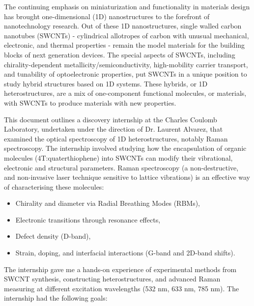 The continuing emphasis on miniaturization and functionality in materials design has brought one-dimensional (1D) nanostructures to the forefront of nanotechnology research. Out of these 1D nanostructures, single walled carbon nanotubes (SWCNTs) - cylindrical allotropes of carbon with unusual mechanical, electronic, and thermal properties - remain the model materials for the building blocks of next generation devices. The special aspects of SWCNTs, including chirality-dependent metallicity/semiconductivity, high-mobility carrier transport, and tunability of optoelectronic properties, put SWCNTs in a unique position to study hybrid structures based on 1D systems. These hybrids, or 1D heterostructures, are a mix of one-component functional molecules, or materials, with SWCNTs to produce materials with new properties.

This document outlines a discovery internship at the Charles Coulomb Laboratory, undertaken under the direction of Dr. Laurent Alvarez, that examined the optical spectroscopy of 1D heterostructures, notably Raman spectroscopy. The internship involved studying how the encapsulation of organic molecules (4T:quaterthiophene) into SWCNTs can modify their vibrational, electronic and structural parameters. Raman spectroscopy (a non-destructive, and non-invasive laser technique sensitive to lattice vibrations) is an effective way of characterising these molecules:

\begin{itemize}
    \item Chirality and diameter via Radial Breathing Modes (RBMs),
\end{itemize}

\begin{itemize}
    \item Electronic transitions through resonance effects,
\end{itemize}

\begin{itemize}
    \item Defect density (D-band),
\end{itemize}

\begin{itemize}
    \item Strain, doping, and interfacial interactions (G-band and 2D-band shifts).
\end{itemize}

The internship gave me a hands-on experience of experimental methods from SWCNT synthesis, constructing heterostructures, and advanced Raman measuring at different excitation wavelengths (532 nm, 633 nm, 785 nm). The internship had the following goals:


